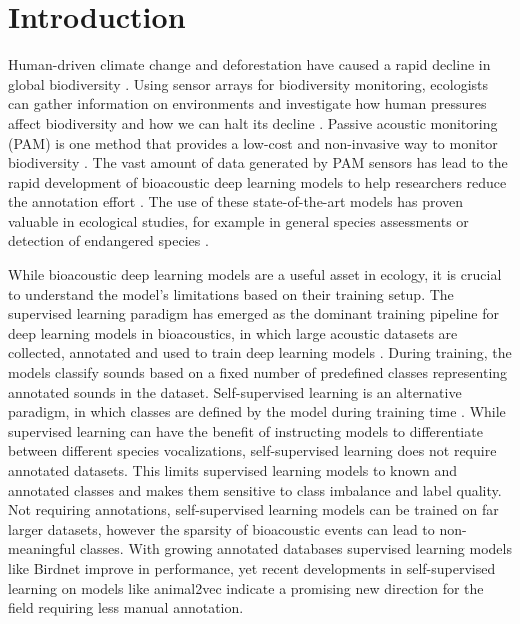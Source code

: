 \section{Introduction}
\label{sec:introcution}

Human-driven climate change and deforestation have caused a rapid decline in global biodiversity \cite{butchart_global_2010}.
Using sensor arrays for biodiversity monitoring, ecologists can gather information on environments and investigate how human pressures affect biodiversity and how we can halt its decline \cite{schmeller_building_2017}.
Passive acoustic monitoring (PAM) is one method that provides a low-cost and non-invasive way to monitor biodiversity \cite{sugai_terrestrial_2019}.
The vast amount of data generated by PAM sensors has lead to the rapid development of bioacoustic deep learning models to help researchers reduce the annotation effort \cite{stowell_computational_2022}.
The use of these state-of-the-art models has proven valuable in ecological studies, for example in general species assessments \cite{tuia_perspectives_2022,cowans_improving_2024} or detection of endangered species \cite{allen-ankins_use_2025}.

While bioacoustic deep learning models are a useful asset in ecology, it is crucial to understand the model's limitations based on their training setup.
The supervised learning paradigm has emerged as the dominant training pipeline for deep learning models in bioacoustics, in which large acoustic datasets are collected, annotated and used to train deep learning models \cite{allen_convolutional_2021,aodha_bat_2018,bergler_orca-spot_2019,kahl_birdnet_2021}. 
During training, the models classify sounds based on a fixed number of predefined classes representing annotated sounds in the dataset.
Self-supervised learning is an alternative paradigm, in which classes are defined by the model during training time \cite{baevski_efficient_2023,huang_masked_2022}.
While supervised learning can have the benefit of instructing models to differentiate between different species vocalizations, self-supervised learning does not require annotated datasets.
This limits supervised learning models to known and annotated classes and makes them sensitive to class imbalance and label quality.
Not requiring annotations, self-supervised learning models can be trained on far larger datasets, however the sparsity of bioacoustic events can lead to non-meaningful classes.
With growing annotated databases supervised learning models like Birdnet \cite{kahl_birdnet_2021} improve in performance, yet recent developments in self-supervised learning on models like animal2vec \cite{schafer-zimmermann_animal2vec_2024} indicate a promising new direction for the field requiring less manual annotation.

